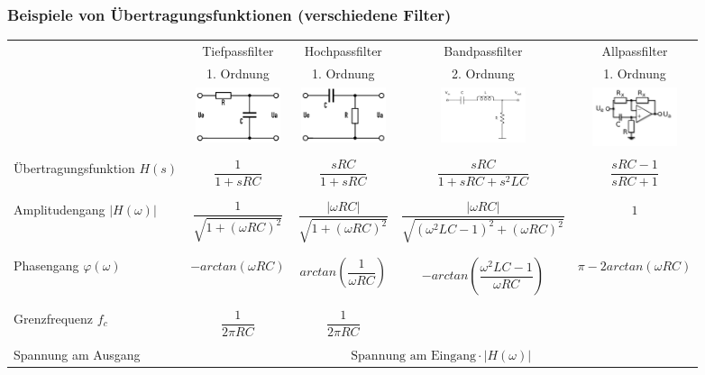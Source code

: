 		\subsubsection{Beispiele von Übertragungsfunktionen (verschiedene Filter)}
			\renewcommand{\arraystretchOriginal}{1}
			\begin{tabularx}{\textwidth}{|X|c|c|c|c|}
			\hline
				{}
			&	Tiefpassfilter
			&	Hochpassfilter
			&	Bandpassfilter
			&	Allpassfilter
			\\
				{}
			&	1. Ordnung
			&	1. Ordnung
			&	2. Ordnung
			&	1. Ordnung
			\\ \hline
				{}
			&	\includegraphics[width=2.5cm]{./bilder/tiefpass.png}
			&	\includegraphics[width=2.5cm]{./bilder/hochpass.png}
			&	\includegraphics[width=2.5cm]{./bilder/bandpass.png}
			&	\includegraphics[width=2.5cm]{./bilder/allpass.png}
			\\ \hline & & & & \\
				Übertragungsfunktion $H(s)$
			&	$\dfrac{1}{1 + sRC}$
			&	$\dfrac{sRC}{1 + sRC}$
			&	$\dfrac{sRC}{1 + sRC + s^2 LC}$
			&	$\dfrac{sRC - 1}{sRC + 1}$
			\\ & & & & \\ \hline & & & & \\
				Amplitudengang $|H(\omega)|$
			&	$\dfrac{1}{\sqrt{1 + (\omega RC)^2}}$
			&	$\dfrac{|\omega RC|}{\sqrt{1 + (\omega RC)^2}}$
			&	$\dfrac{|\omega RC|}{\sqrt{(\omega^2 LC - 1)^2 + (\omega RC)^2}}$
			&	$1$
			\\ & & & & \\ \hline & & & & \\
				Phasengang $\varphi(\omega)$
			&	$-arctan(\omega RC)$
			&	$arctan(\dfrac{1}{\omega RC})$
			&	$-arctan(\dfrac{\omega^2 LC -1}{\omega RC})$
			&	$\pi - 2 arctan(\omega RC)$
			\\ & & & & \\ \hline & & & & \\
				Grenzfrequenz $f_c$
			&	$\dfrac{1}{2 \pi RC}$
			&	$\dfrac{1}{2 \pi RC}$
			&
			& 	
			\\ & & & & \\ \hline
				Spannung am Ausgang
			&	\multicolumn{4}{|c|}{
					$\text{Spannung am Eingang} \cdot |H(\omega)|$
				}
			\\ \hline
			\end{tabularx}
			
